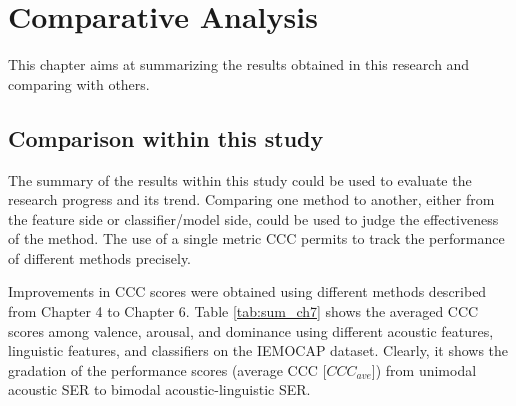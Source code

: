 \chapter{Comparative Analysis}
This chapter aims at summarizing the results obtained in this research and
comparing with others.


\section{Comparison within this study}
The summary of the results within this study could be used to evaluate the
research progress and its trend. Comparing one method to another, either from
the feature side or classifier/model side, could be used to judge the
effectiveness of the method.  The use of a single metric CCC permits to track
the performance of different methods precisely.

Improvements in CCC scores were obtained using different methods described from
Chapter 4 to Chapter 6. Table \ref{tab:sum_ch7} shows the averaged CCC scores
among valence, arousal, and dominance using different acoustic features,
linguistic features, and classifiers on the IEMOCAP dataset. Clearly, it shows
the gradation of the performance scores (average CCC [$CCC_{ave}$]) from
unimodal acoustic SER to bimodal acoustic-linguistic SER.

